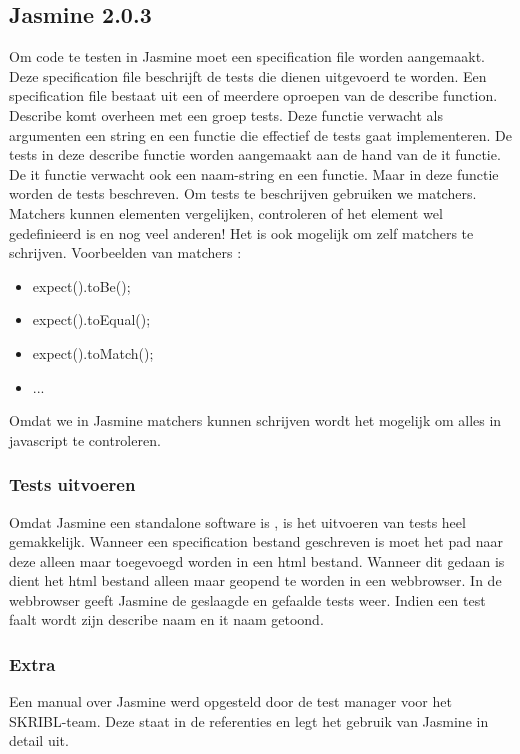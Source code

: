 \documentclass{article}
\begin{document}
\subsection{Jasmine 2.0.3}
Om code te testen in Jasmine moet een specification file worden aangemaakt. Deze specification file beschrijft de tests die dienen uitgevoerd te worden. 
\newline
Een specification file bestaat uit een of meerdere oproepen van de describe function. Describe komt overheen met een groep tests. Deze functie verwacht als argumenten een string en een functie die effectief de tests gaat implementeren.
\newline
De tests in deze describe functie worden aangemaakt aan de hand van de it functie. De it functie verwacht ook een naam-string en een functie. Maar in deze %
functie worden de tests beschreven.
\newline
Om tests te beschrijven gebruiken we matchers. Matchers kunnen elementen vergelijken, controleren of het element wel gedefinieerd is en nog veel anderen! Het is ook mogelijk om zelf matchers te schrijven.
Voorbeelden van matchers :
\begin{itemize}
  \item expect().toBe();
  \item expect().toEqual();
  \item expect().toMatch();
  \item ...

\end{itemize}
Omdat we in Jasmine matchers kunnen schrijven wordt het mogelijk om alles in javascript te controleren.
\subsubsection{Tests uitvoeren}
Omdat Jasmine een standalone software is , is het uitvoeren van tests heel gemakkelijk. Wanneer een specification bestand geschreven is moet het pad naar deze alleen maar toegevoegd worden in een html bestand. Wanneer dit gedaan is dient het html bestand alleen maar geopend te worden in een webbrowser. In de webbrowser geeft Jasmine de geslaagde en gefaalde tests weer. Indien een test faalt wordt zijn describe naam en it naam getoond.

\subsubsection{Extra}
Een manual over Jasmine werd opgesteld door de test manager voor het SKRIBL-team. Deze staat in de referenties en legt het gebruik van Jasmine in detail uit.
\end{document}
